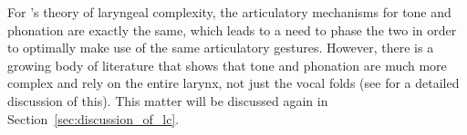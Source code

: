 
        
        

For \citeauthor{silvermanLaryngealComplexityOtomanguean1997}'s \citeyear{silvermanLaryngealComplexityOtomanguean1997} theory of laryngeal complexity, the articulatory mechanisms for tone and phonation are exactly the same, which leads to a need to phase the two in order to optimally make use of the same articulatory gestures. However, there is a growing body of literature that shows that tone and phonation are much more complex and rely on the entire larynx, not just the vocal folds (see \cite{eslingVoiceQualityLaryngeal2019} for a detailed discussion of this). This matter will be discussed again in Section~\ref{sec:discussion_of_lc}.

